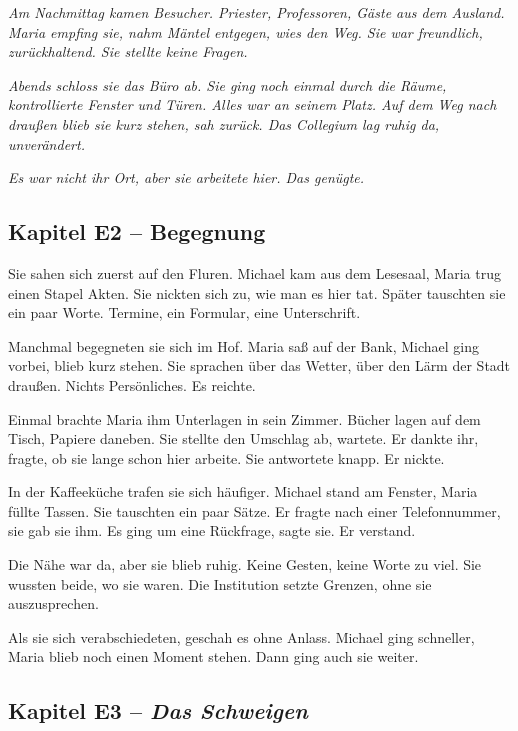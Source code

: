 \documentclass[
]{article}
\begin{document}
\emph{Am Nachmittag kamen Besucher. Priester, Professoren, Gäste aus dem Ausland. Maria empfing sie, nahm Mäntel entgegen, wies den Weg. Sie war freundlich, zurückhaltend. Sie stellte keine Fragen.}

\emph{Abends schloss sie das Büro ab. Sie ging noch einmal durch die Räume, kontrollierte Fenster und Türen. Alles war an seinem Platz. Auf dem Weg nach draußen blieb sie kurz stehen, sah zurück. Das Collegium lag ruhig da, unverändert.}

\emph{Es war nicht ihr Ort, aber sie arbeitete hier. Das genügte.}

\subsection{Kapitel E2 -- Begegnung}\label{kapitel-e2-begegnung}

Sie sahen sich zuerst auf den Fluren. Michael kam aus dem Lesesaal, Maria trug einen Stapel Akten. Sie nickten sich zu, wie man es hier tat. Später tauschten sie ein paar Worte. Termine, ein Formular, eine Unterschrift.

Manchmal begegneten sie sich im Hof. Maria saß auf der Bank, Michael ging vorbei, blieb kurz stehen. Sie sprachen über das Wetter, über den Lärm der Stadt draußen. Nichts Persönliches. Es reichte.

Einmal brachte Maria ihm Unterlagen in sein Zimmer. Bücher lagen auf dem Tisch, Papiere daneben. Sie stellte den Umschlag ab, wartete. Er dankte ihr, fragte, ob sie lange schon hier arbeite. Sie antwortete knapp. Er nickte.

In der Kaffeeküche trafen sie sich häufiger. Michael stand am Fenster, Maria füllte Tassen. Sie tauschten ein paar Sätze. Er fragte nach einer Telefonnummer, sie gab sie ihm. Es ging um eine Rückfrage, sagte sie. Er verstand.

Die Nähe war da, aber sie blieb ruhig. Keine Gesten, keine Worte zu viel. Sie wussten beide, wo sie waren. Die Institution setzte Grenzen, ohne sie auszusprechen.

Als sie sich verabschiedeten, geschah es ohne Anlass. Michael ging schneller, Maria blieb noch einen Moment stehen. Dann ging auch sie weiter.

\subsection{\texorpdfstring{Kapitel E3 -- \emph{Das Schweigen}}{Kapitel E3 -- Das Schweigen}}\label{kapitel-e3-das-schweigen}
\end{document}

